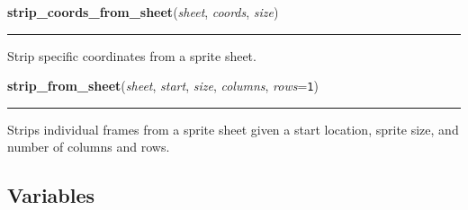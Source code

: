     \vspace{0.5ex}

\hspace{.8\funcindent}\begin{boxedminipage}{\funcwidth}

    \raggedright \textbf{strip\_coords\_from\_sheet}(\textit{sheet}, \textit{coords}, \textit{size})

    \vspace{-1.5ex}

    \rule{\textwidth}{0.5\fboxrule}
\setlength{\parskip}{2ex}
    Strip specific coordinates from a sprite sheet.

\setlength{\parskip}{1ex}
    \end{boxedminipage}

    \label{pygame-asteroids:tools:strip_from_sheet}

    \vspace{0.5ex}

\hspace{.8\funcindent}\begin{boxedminipage}{\funcwidth}

    \raggedright \textbf{strip\_from\_sheet}(\textit{sheet}, \textit{start}, \textit{size}, \textit{columns}, \textit{rows}={\tt 1})

    \vspace{-1.5ex}

    \rule{\textwidth}{0.5\fboxrule}
\setlength{\parskip}{2ex}
    Strips individual frames from a sprite sheet given a start location, 
    sprite size, and number of columns and rows.

\setlength{\parskip}{1ex}
    \end{boxedminipage}



  \subsection{Variables}

